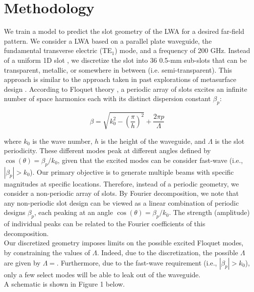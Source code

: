 \documentclass[11pt]{article}
\begin{document}
\section*{Methodology}

We train a model to predict the slot geometry of the LWA for a desired far-field pattern. We consider a LWA based on a parallel plate waveguide, the fundamental transverse electric (TE$_1$) mode, and a frequency of 200 GHz. Instead of a uniform 1D slot \cite{doi:10.1063/5.0033126}, we discretize the slot into 36 0.5-mm sub-slots that can be transparent, metallic, or somewhere in between (i.e. semi-transparent). This approach is similar to the approach taken in past explorations of metasurface design \cite{Liu:2022tg, Jafar-Zanjani:2018vy}. According to Floquet theory \cite{6556051}, a periodic array of slots excites an infinite number of space harmonics each with its distinct dispersion constant $\beta_p$:

\[\beta=\sqrt{k_0^2 - (\frac{\pi}{h})^2} +\frac{2\pi p}{\Lambda} \tag{1} \label{eq:special}\] 

\noindent where $k_0$ is the wave number, $h$ is the height of the waveguide, and $\Lambda$ is the slot periodicity. These different modes peak at different angles defined by $\cos(\theta)=\beta_p/k_0$, given that the excited modes can be consider fast-wave (i.e., $|\beta_p|>k_0$). Our primary objective is to generate multiple beams with specific magnitudes at specific locations. Therefore, instead of a periodic geometry, we consider a non-periodic array of slots. By Fourier decomposition, we note that any non-periodic slot design can be viewed as a linear combination of periodic designs $\beta_p$, each peaking at an angle $\cos(\theta)=\beta_p/k_0$. The strength (amplitude) of individual peaks can be related to the Fourier coefficients of this decomposition. \\

\noindent Our discretized geometry imposes limits on the possible excited Floquet modes, by constraining the values of $\Lambda$. Indeed, due to the discretization, the possible $\Lambda$ are given by $\Lambda=$. Furthermore, due to the fast-wave requirement (i.e., $|\beta_p|>k_0$), only a few select modes will be able to leak out of the waveguide. \\

 A schematic is shown in Figure 1 below. \\
\end{document}
